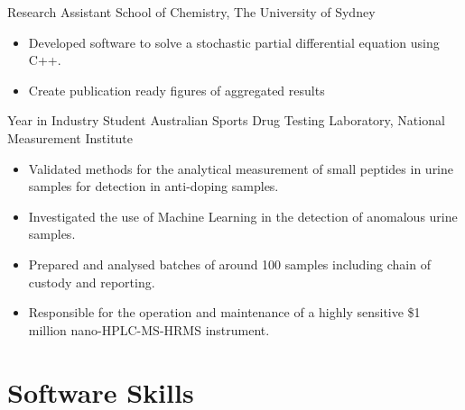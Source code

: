 {Research Assistant}
{School of Chemistry, The University of Sydney}
{}{}{%
  \begin{itemize}
    \item Developed software to solve a stochastic partial differential equation using C++.
    \item Create publication ready figures of aggregated results
  \end{itemize}
}
\vspace{1em}

{Year in Industry Student}
{Australian Sports Drug Testing Laboratory, National Measurement Institute}
{}{}
{%
  \begin{itemize}
    \item Validated methods for the analytical measurement of small peptides in urine samples
      for detection in anti-doping samples.
    \item Investigated the use of Machine Learning in the detection of anomalous urine samples.
    \item Prepared and analysed batches of around 100 samples including chain of custody and reporting.
    \item Responsible for the operation and maintenance of a highly sensitive \$1 million nano-HPLC-MS-HRMS instrument.
  \end{itemize}
}


\section{Software Skills}


